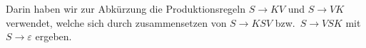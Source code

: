 \begin{loesung}
Darin haben wir zur Abkürzung die Produktionsregeln
$S\to KV$ und $S\to VK$ verwendet, welche sich durch
zusammensetzen von $S\to KSV$ bzw.~$S\to VSK$ mit $S\to\varepsilon$
ergeben.
\end{loesung}

